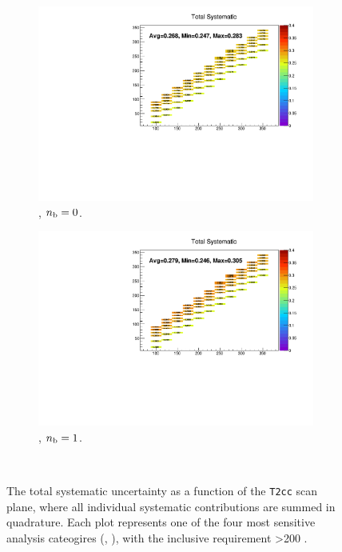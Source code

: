 \begin{figure}[h!]
\begin{subfigure}[b]{0.47\textwidth}
    \includegraphics[width=\textwidth]{Figs/sms/t2cc/v37/systs/total_T2cc_eq0b_ge4j_incl.pdf}
    \caption{\njhigh, $n_{\text{b}} = 0$.}
  \end{subfigure}
  \begin{subfigure}[b]{0.47\textwidth}
    \includegraphics[width=\textwidth]{Figs/sms/t2cc/v37/systs/total_T2cc_eq1b_ge4j_incl.pdf}
    \caption{\njhigh, $n_{\text{b}} = 1$.}
  \end{subfigure}\\
  \caption{The total systematic uncertainty as a function of the \texttt{T2cc} scan plane,
  where all individual systematic contributions are summed in quadrature.
  Each plot represents one of the four most sensitive 
  analysis cateogires (\nb, \nj), with the inclusive requirement \HT>200 \gev.}
  \label{fig:sms-totalsyst-t2cc}
\end{figure}

